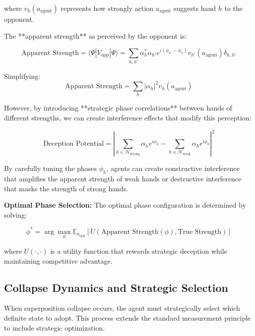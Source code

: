 \documentclass[11pt,a4paper]{article}
\begin{document}
where $v_h(a_{\text{agent}})$ represents how strongly action $a_{\text{agent}}$ suggests hand $h$ to the opponent.

The **apparent strength** as perceived by the opponent is:

\begin{equation}
\text{Apparent Strength} = \langle \Psi | V_{\text{opp}} | \Psi \rangle = \sum_{h,h'} \alpha_h^* \alpha_{h'} e^{i(\phi_{h'} - \phi_h)} v_{h'}(a_{\text{agent}}) \delta_{h,h'}
\end{equation}

Simplifying:
\begin{equation}
\text{Apparent Strength} = \sum_{h} |\alpha_h|^2 v_h(a_{\text{agent}})
\end{equation}

However, by introducing **strategic phase correlations** between hands of different strengths, we can create interference effects that modify this perception:

\begin{equation}
\text{Deception Potential} = \left|\sum_{h \in \mathcal{H}_{\text{strong}}} \alpha_h e^{i\phi_h} - \sum_{h \in \mathcal{H}_{\text{weak}}} \alpha_h e^{i\phi_h}\right|^2
\end{equation}

By carefully tuning the phases $\phi_h$, agents can create constructive interference that amplifies the apparent strength of weak hands or destructive interference that masks the strength of strong hands.

\textbf{Optimal Phase Selection:} The optimal phase configuration is determined by solving:

\begin{equation}
\phi^* = \arg\max_{\phi} \mathbb{E}_{a_{\text{opp}}}\left[U(\text{Apparent Strength}(\phi), \text{True Strength})\right]
\end{equation}

where $U(\cdot, \cdot)$ is a utility function that rewards strategic deception while maintaining competitive advantage.

\subsection{Collapse Dynamics and Strategic Selection}

When superposition collapse occurs, the agent must strategically select which definite state to adopt. This process extends the standard measurement principle to include strategic optimization.
\end{document}
